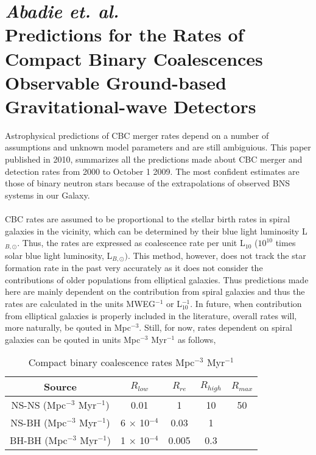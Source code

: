 \documentclass{article}
\numberwithin{equation}{section}
\begin{document}
\section*{\normalsize{\textit{Abadie et. al.\\}}\small{Predictions for the Rates of Compact Binary Coalescences Observable Ground-based Gravitational-wave Detectors}}
Astrophysical predictions of CBC merger rates depend on a number of assumptions and unknown model parameters and are still ambiguious. This paper published in 2010, summarizes all the predictions made about CBC merger and detection rates from 2000 to October 1 2009. The most confident estimates are those of binary neutron stars because of the extrapolations of observed BNS systems in our Galaxy.\\
\\
CBC rates are assumed to be proportional to the stellar birth rates in spiral galaxies in the vicinity, which can be determined by their blue light luminosity L$_{B, \odot}$. Thus, the rates are expressed as coalescence rate per unit L$_{10}$ ($10^{10}$ times solar blue light luminosity, L$_{B, \odot})$. This method, however, does not track the star formation rate in the past very accurately as it does not consider the contributions of older populations from elliptical galaxies. Thus predictions made here are mainly dependent on the contribution from spiral galaxies and thus the rates are calculated in the units MWEG$^{-1}$ or L$_{10}^{-1}$. In future, when contribution from elliptical galaxies is properly included in the literature, overall rates will, more naturally, be qouted in Mpc$^{-3}$. Still, for now, rates dependent on spiral galaxies can be qouted in units Mpc$^{-3}$ Myr$^{-1}$ as follows,

\begin{table}[h!]
	\centering
	\caption{Compact binary coalescence rates Mpc$^{-3}$ Myr$^{-1}$}
	\label{tab:table1}
	\begin{tabular}{ccccc}
		\toprule
		Source & $R_{low}$ & $R_{re}$ & $R_{high}$ & $R_{max}$\\
		\midrule
		NS-NS (Mpc$^{-3}$ Myr$^{-1}$) & 0.01 & 1 & 10 & 50\\
		NS-BH (Mpc$^{-3}$ Myr$^{-1}$) & 6 $\times$ 10$^{-4}$ & 0.03 & 1 & \\
		BH-BH (Mpc$^{-3}$ Myr$^{-1}$) & 1 $\times$ 10$^{-4}$ & 0.005 & 0.3 & \\
		\bottomrule
	\end{tabular}
\end{table}
\end{document}
